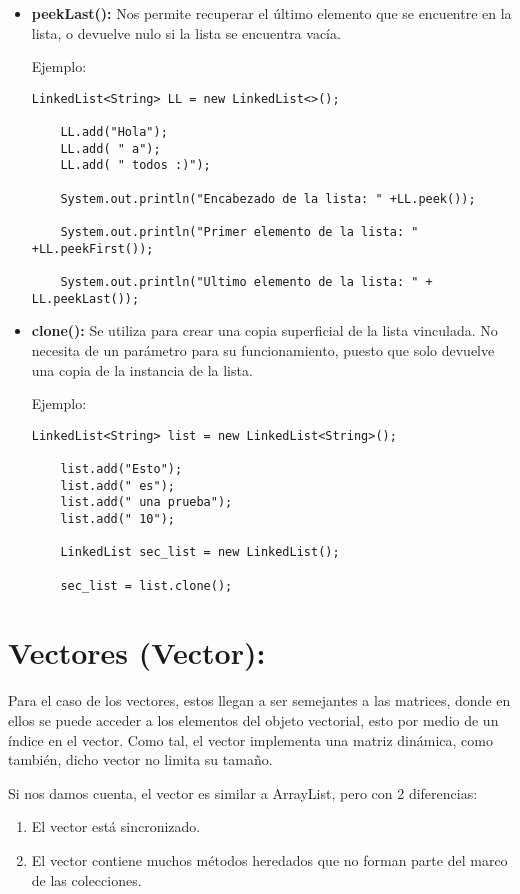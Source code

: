 \documentclass[12pt, letterpaper]{article} %
\begin{document}
\begin{itemize}
    \item \textbf{peekLast():} Nos permite recuperar el último elemento que se encuentre en la lista, o devuelve nulo si la lista se encuentra vacía.

    Ejemplo:
    \lstset{language = Java, breaklines=true, basicstyle=\footnotesize}
    \begin{lstlisting}[frame=single]
    LinkedList<String> LL = new LinkedList<>();

    LL.add("Hola");  
    LL.add( " a");
    LL.add( " todos :)");

    System.out.println("Encabezado de la lista: " +LL.peek());

    System.out.println("Primer elemento de la lista: " +LL.peekFirst());

    System.out.println("Ultimo elemento de la lista: " + LL.peekLast());
    \end{lstlisting}

    \item \textbf{clone():} Se utiliza para crear una copia superficial de la lista vinculada. No necesita de un parámetro para su funcionamiento, puesto que solo devuelve una copia de la instancia de la lista.

    Ejemplo:
    \lstset{language = Java, breaklines=true, basicstyle=\footnotesize}
    \begin{lstlisting}[frame=single]
    LinkedList<String> list = new LinkedList<String>();

    list.add("Esto");
    list.add(" es");
    list.add(" una prueba");
    list.add(" 10");

    LinkedList sec_list = new LinkedList();

    sec_list = list.clone();
    \end{lstlisting}
    
\end{itemize}

\section*{Vectores (Vector):}
Para el caso de los vectores, estos llegan a ser semejantes a las matrices, donde en ellos se puede acceder a los elementos del objeto vectorial, esto por medio de un índice en el vector. Como tal, el vector implementa una matriz dinámica, como también, dicho vector no limita su tamaño.

Si nos damos cuenta, el vector es similar a ArrayList, pero con 2 diferencias:
\begin{enumerate}
    \item El vector está sincronizado.
    \item El vector contiene muchos métodos heredados que no forman parte del marco de las colecciones.
\end{enumerate}
\end{document}
